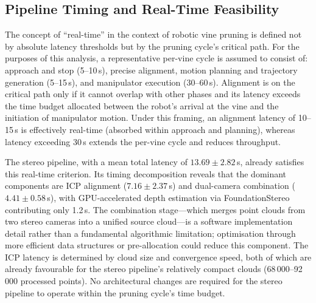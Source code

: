 \subsection{Pipeline Timing and Real-Time Feasibility}
\label{subsec:pa-discussion-timing}

The concept of ``real-time'' in the context of robotic vine pruning is defined not by absolute latency thresholds but by the pruning cycle's critical path. For the purposes of this analysis, a representative per-vine cycle is assumed to consist of: approach and stop (5--10\,s), precise alignment, motion planning and trajectory generation (5--15\,s), and manipulator execution (30--60\,s). Alignment is on the critical path only if it cannot overlap with other phases and its latency exceeds the time budget allocated between the robot's arrival at the vine and the initiation of manipulator motion. Under this framing, an alignment latency of 10--15\,s is effectively real-time (absorbed within approach and planning), whereas latency exceeding 30\,s extends the per-vine cycle and reduces throughput.

The stereo pipeline, with a mean total latency of $13.69 \pm 2.82$\,s, already satisfies this real-time criterion. Its timing decomposition reveals that the dominant components are ICP alignment ($7.16 \pm 2.37$\,s) and dual-camera combination ($4.41 \pm 0.58$\,s), with GPU-accelerated depth estimation via FoundationStereo contributing only 1.2\,s. The combination stage---which merges point clouds from two stereo cameras into a unified source cloud---is a software implementation detail rather than a fundamental algorithmic limitation; optimisation through more efficient data structures or pre-allocation could reduce this component. The ICP latency is determined by cloud size and convergence speed, both of which are already favourable for the stereo pipeline's relatively compact clouds (68\,000--92\,000 processed points). No architectural changes are required for the stereo pipeline to operate within the pruning cycle's time budget.

